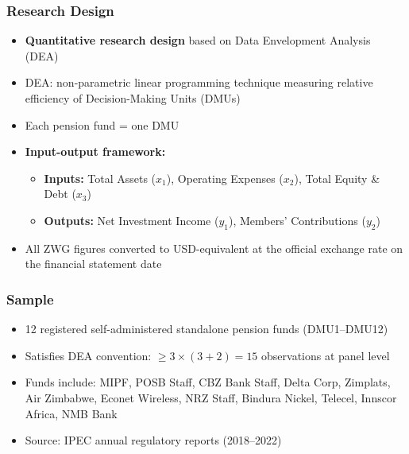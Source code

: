 \documentclass{beamer}
\begin{document}

\begin{frame}
    \frametitle{Research Design}
    \begin{itemize}
        \item \textbf{Quantitative research design} based on Data Envelopment Analysis (DEA)
        \item DEA: non-parametric linear programming technique measuring relative efficiency of Decision-Making Units (DMUs)
        \item Each pension fund = one DMU
        \item \textbf{Input-output framework:}
        \begin{itemize}
            \item \textbf{Inputs:} Total Assets ($x_1$), Operating Expenses ($x_2$), Total Equity \& Debt ($x_3$)
            \item \textbf{Outputs:} Net Investment Income ($y_1$), Members' Contributions ($y_2$)
        \end{itemize}
        \item All ZWG figures converted to USD-equivalent at the official exchange rate on the financial statement date
    \end{itemize}
\end{frame}

\begin{frame}
    \frametitle{Sample}
    \begin{itemize}
        \item 12 registered self-administered standalone pension funds (DMU1--DMU12)
        \item Satisfies DEA convention: $\geq 3 \times (3 + 2) = 15$ observations at panel level
        \item Funds include: MIPF, POSB Staff, CBZ Bank Staff, Delta Corp, Zimplats, Air Zimbabwe, Econet Wireless, NRZ Staff, Bindura Nickel, Telecel, Innscor Africa, NMB Bank
        \item Source: IPEC annual regulatory reports (2018--2022)
    \end{itemize}
\end{frame}
\end{document}

